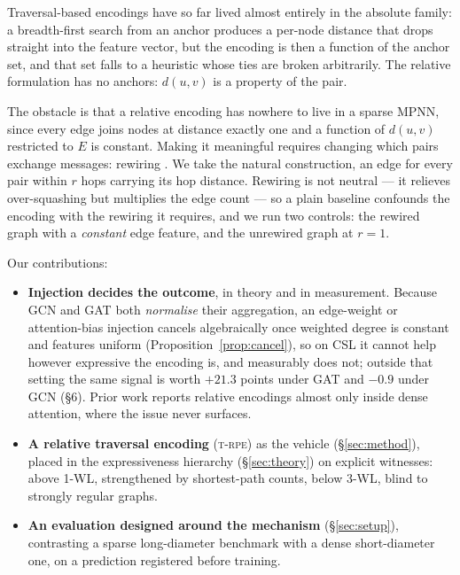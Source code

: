 \documentclass[11pt]{article}
\newcommand{\TRPE}{\textsc{t-rpe}}
\begin{document}
Traversal-based encodings have so far lived almost entirely in the absolute family: a
breadth-first search from an anchor produces a per-node distance that drops straight into the
feature vector, but the encoding is then a function of the anchor set, and that set falls to a
heuristic whose ties are broken arbitrarily. The relative formulation has no anchors: $d(u,v)$ is
a property of the pair.

The obstacle is that a relative encoding has nowhere to live in a sparse MPNN, since every edge
joins nodes at distance exactly one and a function of $d(u,v)$ restricted to $E$ is constant.
Making it meaningful requires changing which pairs exchange messages: rewiring
\citep{bruel2022rewiring,topping2022curvature}. We take the natural construction, an edge for
every pair within $r$ hops carrying its hop distance. Rewiring is not neutral --- it relieves
over-squashing \citep{alon2021bottleneck} but multiplies the edge count --- so a plain baseline
confounds the encoding with the rewiring it requires, and we run two controls: the rewired graph
with a \emph{constant} edge feature, and the unrewired graph at $r=1$.

Our contributions:

\begin{itemize}\itemsep1pt
\item \textbf{Injection decides the outcome}, in theory and in measurement. Because GCN and GAT
  both \emph{normalise} their aggregation, an edge-weight or attention-bias injection cancels
  algebraically once weighted degree is constant and features uniform
  (Proposition~\ref{prop:cancel}), so on CSL it cannot help however expressive the encoding is,
  and measurably does not; outside that setting the same signal is worth $+21.3$ points under GAT
  and $-0.9$ under GCN (\S6). Prior work reports relative encodings almost only inside dense
  attention, where the issue never surfaces.
\item \textbf{A relative traversal encoding} (\TRPE) as the vehicle (\S\ref{sec:method}), placed
  in the expressiveness hierarchy (\S\ref{sec:theory}) on explicit witnesses: above 1-WL,
  strengthened by shortest-path counts, below 3-WL, blind to strongly regular graphs.
\item \textbf{An evaluation designed around the mechanism} (\S\ref{sec:setup}), contrasting a
  sparse long-diameter benchmark with a dense short-diameter one, on a prediction registered
  before training.
\end{itemize}
\end{document}
